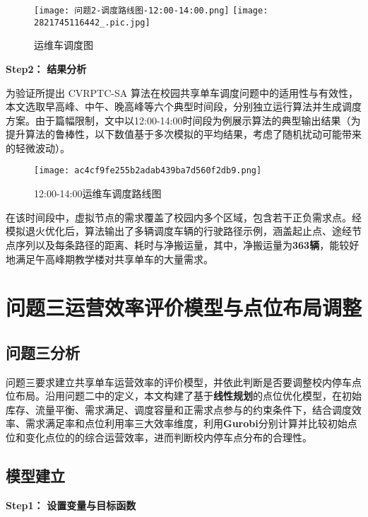 \documentclass[withoutpreface,bwprint]{cumcmthesis}
\begin{document}
\begin{figure}[H]
\centering
{}
{\texttt{[image: 问题2-调度路线图-12:00-14:00.png]}}
{\texttt{[image: 2821745116442\_.pic.jpg]}}
\caption{运维车调度图}\label{fig:运维车调度图}
\end{figure}

\textbf{Step2：} \textbf{结果分析}

为验证所提出 CVRPTC-SA 算法在校园共享单车调度问题中的适用性与有效性，本文选取早高峰、中午、晚高峰等六个典型时间段，分别独立运行算法并生成调度方案。由于篇幅限制，文中以12:00-14:00时间段为例展示算法的典型输出结果（为提升算法的鲁棒性，以下数值基于多次模拟的平均结果，考虑了随机扰动可能带来的轻微波动）。

\begin{figure}[H]
  \centering
  \texttt{[image: ac4cf9fe255b2adab439ba7d560f2db9.png]} %
  \caption{12:00-14:00运维车调度路线图} 
  \label{fig:7:00-9:00运维车调度路线图}
\end{figure}

在该时间段中，虚拟节点的需求覆盖了校园内多个区域，包含若干正负需求点。经模拟退火优化后，算法输出了多辆调度车辆的行驶路径示例，涵盖起止点、途经节点序列以及每条路径的距离、耗时与净搬运量，其中，净搬运量为\textbf{363辆}，能较好地满足午高峰期教学楼对共享单车的大量需求。


\section{问题三\hspace{1em}运营效率评价模型与点位布局调整}
\subsection{问题三分析}
问题三要求建立共享单车运营效率的评价模型，并依此判断是否要调整校内停车点位布局。沿用问题二中的定义，本文构建了基于\textbf{线性规划}的点位优化模型，在初始库存、流量平衡、需求满足、调度容量和正需求点参与的约束条件下，结合调度效率、需求满足率和点位利用率三大效率维度，利用\textbf{Gurobi}分别计算并比较初始点位和变化点位的的综合运营效率，进而判断校内停车点分布的合理性。
\subsection{模型建立}
\textbf{Step1：} \textbf{设置变量与目标函数}
\end{document}
